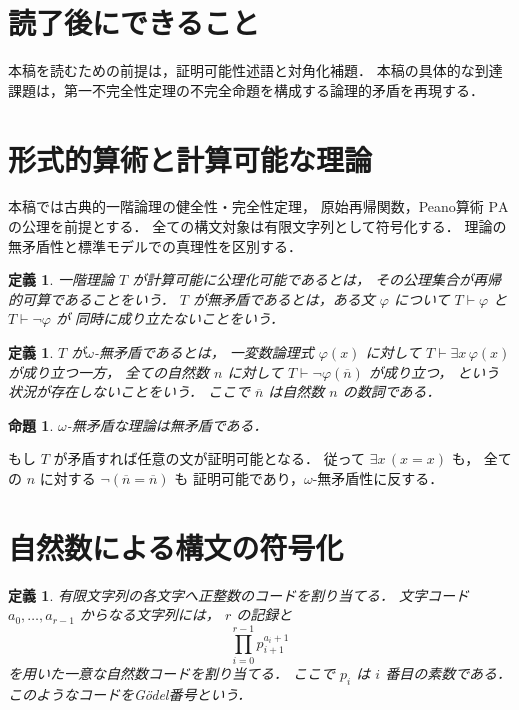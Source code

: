 \documentclass[a5paper,10pt,onecolumn]{jsarticle}
\makeatletter
\theoremstyle{mathnotetheorem}
\newtheorem{definition}[theorem]{定義}
\newtheorem{proposition}[theorem]{命題}
\renewcommand{\proofname}{証明}
\renewenvironment{proof}[1][\proofname]{%
  \par\pushQED{\qed}\normalfont\topsep4\p@\@plus2\p@\relax
  \trivlist\item[\hskip\labelsep\bfseries #1]\ignorespaces
}{\popQED\endtrivlist\@endpefalse}
\makeatother
\begin{document}
\section*{読了後にできること}
本稿を読むための前提は，証明可能性述語と対角化補題．
本稿の具体的な到達課題は，第一不完全性定理の不完全命題を構成する論理的矛盾を再現する．

\section{形式的算術と計算可能な理論}

本稿では古典的一階論理の健全性・完全性定理，
原始再帰関数，Peano算術 $\mathrm{PA}$ の公理を前提とする．
全ての構文対象は有限文字列として符号化する．
理論の無矛盾性と標準モデルでの真理性を区別する．

\begin{definition}
一階理論 $T$ が\emph{計算可能に公理化可能}であるとは，
その公理集合が再帰的可算であることをいう．
$T$ が無矛盾であるとは，ある文 $\varphi$ について
$T\vdash\varphi$ と $T\vdash\neg\varphi$ が
同時に成り立たないことをいう．
\end{definition}

\begin{definition}
$T$ が\emph{$\omega$-無矛盾}であるとは，
一変数論理式 $\varphi(x)$ に対して
$T\vdash\exists x\,\varphi(x)$ が成り立つ一方，
全ての自然数 $n$ に対して
$T\vdash\neg\varphi(\overline n)$ が成り立つ，
という状況が存在しないことをいう．
ここで $\overline n$ は自然数 $n$ の数詞である．
\end{definition}

\begin{proposition}
$\omega$-無矛盾な理論は無矛盾である．
\end{proposition}
\begin{proof}
もし $T$ が矛盾すれば任意の文が証明可能となる．
従って $\exists x\,(x=x)$ も，
全ての $n$ に対する $\neg(\overline n=\overline n)$ も
証明可能であり，$\omega$-無矛盾性に反する．
\end{proof}

\section{自然数による構文の符号化}

\begin{definition}
有限文字列の各文字へ正整数のコードを割り当てる．
文字コード $a_0,\dots,a_{r-1}$ からなる文字列には，
$r$ の記録と
\[
 \prod_{i=0}^{r-1}p_{i+1}^{a_i+1}
\]
を用いた一意な自然数コードを割り当てる．
ここで $p_i$ は $i$ 番目の素数である．
このようなコードをGödel番号という．
\end{definition}
\end{document}
